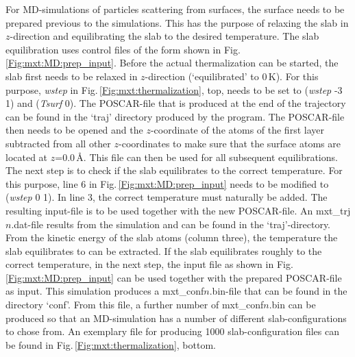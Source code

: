 \documentclass[twoside, 11pt, titlepage, captions=nooneline, a4paper, headsepline]{scrbook}%
\newcommand{\9}{\mathrm}
\newcommand{\0}{\,\mathrm}
\begin{document}
For MD-simulations of particles scattering from surfaces, the surface needs to be prepared previous to the simulations. This has the purpose of relaxing the slab in $z$-direction and equilibrating the slab to the desired temperature. The slab equilibration uses control files of the form shown in Fig.\,\ref{Fig:mxt:MD:prep_input}. Before the actual thermalization can be started, the slab first needs to be relaxed in $z$-direction (`equilibrated' to 0\,K). For this purpose, \textit{wstep} in Fig.\,\ref{Fig:mxt:thermalization}, top, needs to be set to (\textit{wstep} -3 1) and (\textit{Tsurf} 0). The POSCAR-file that is produced at the end of the trajectory can be found in the `traj' directory produced by the program. The POSCAR-file then needs to be opened and the $z$-coordinate of the atoms of the first layer subtracted from all other $z$-coordinates to make sure that the surface atoms are located at $z$=0.0\,\AA. This file can then be used for all subsequent equilibrations. The next step is to check if the slab equilibrates to the correct temperature. For this purpose, line 6 in Fig.\,\ref{Fig:mxt:MD:prep_input} needs to be modified to (\textit{wstep} 0 1). In line 3, the correct temperature must naturally be added. The resulting input-file is to be used together with the new POSCAR-file. An mxt\_trj$n$.dat-file results from the simulation and can be found in the `traj'-directory. From the kinetic energy of the slab atoms (column three), the temperature the slab equilibrates to can be extracted. If the slab equilibrates roughly to the correct temperature, in the next step, the input file as shown in Fig.\,\ref{Fig:mxt:MD:prep_input} can be used together with the prepared POSCAR-file as input. This simulation produces a mxt\_conf$n$.bin-file that can be found in the directory `conf'. From this file, a further number of mxt\_conf$n$.bin can be produced so that an MD-simulation has a number of different slab-configurations to chose from. An exemplary file for producing 1000 slab-configuration files can be found in Fig.\,\ref{Fig:mxt:thermalization}, bottom.
\end{document}
